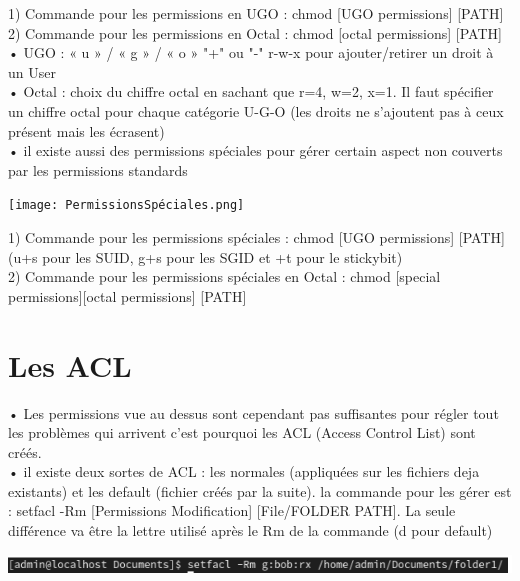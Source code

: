 \documentclass[a4paper, 11pt, french, oneside]{book}
\begin{document}
 1) Commande pour les permissions en UGO : chmod [UGO permissions] [PATH] \\
 2) Commande pour les permissions en Octal : chmod [octal permissions] [PATH] \\


• UGO : « u » / « g » / « o » "+" ou "-" r-w-x pour ajouter/retirer un droit à un User \\

• Octal : choix du chiffre octal en sachant que r=4, w=2, x=1. Il faut spécifier un chiffre octal pour chaque catégorie U-G-O (les droits ne s'ajoutent pas à ceux présent mais les écrasent) \\

• il existe aussi des permissions spéciales pour gérer certain aspect non couverts par les permissions standards \\

\begin{flushleft}
\texttt{[image: PermissionsSpéciales.png]}
\end{flushleft}


 1) Commande pour les permissions spéciales : chmod [UGO permissions] [PATH] (u+s pour les SUID, g+s pour les SGID et +t pour le stickybit) \\

 2) Commande pour les permissions spéciales en Octal : chmod [special permissions][octal permissions] [PATH] \\


\section{\Large Les ACL} 

• Les permissions vue au dessus sont cependant pas suffisantes pour régler tout les problèmes qui arrivent c'est pourquoi les ACL (Access Control List) sont créés. \\

• il existe deux sortes de ACL : les normales (appliquées sur les fichiers deja existants) et les default (fichier créés par la suite). la commande pour les gérer est : setfacl -Rm [Permissions Modification] [File/FOLDER PATH]. La seule différence va être la lettre utilisé après le Rm de la commande  (d pour default)  \\
\begin{flushleft}
\includegraphics[scale=1]{ACL.png}
\end{flushleft}
\end{document}
